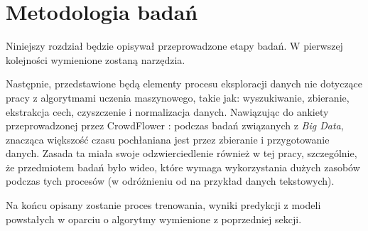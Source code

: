 
\chapter{Metodologia badań}
Niniejszy rozdział będzie opisywał przeprowadzone etapy badań. W pierwszej kolejności wymienione zostaną narzędzia. 

Następnie, przedstawione będą elementy procesu eksploracji danych nie dotyczące pracy z algorytmami uczenia maszynowego, takie jak: wyszukiwanie, zbieranie, ekstrakcja cech, czyszczenie i normalizacja danych. Nawiązując do ankiety przeprowadzonej przez CrowdFlower \cite{ds_report}: podczas badań związanych z {\em Big Data}, znacząca większość czasu pochłaniana jest przez zbieranie i przygotowanie danych. Zasada ta miała swoje odzwierciedlenie również w tej pracy, szczególnie, że przedmiotem badań było wideo, które wymaga wykorzystania dużych zasobów podczas tych procesów (w odróżnieniu od na przykład danych tekstowych). 

Na końcu opisany zostanie proces trenowania, wyniki predykcji z modeli powstałych w oparciu o algorytmy wymienione z poprzedniej sekcji.
\label{cha:pierwszyDokument}


